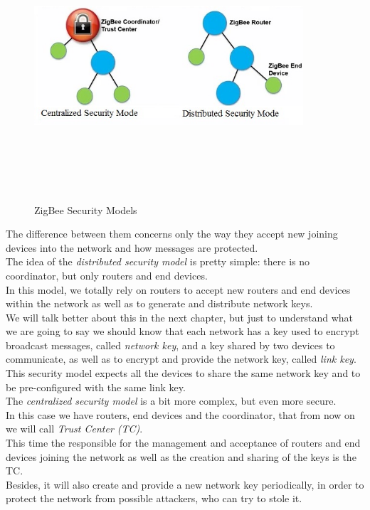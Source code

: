 \documentclass[12pt]{report}
\begin{document}
{{\begin{figure}[H]
\includegraphics[width=10cm,height=10cm,keepaspectratio]{security_models}
\centering
\caption{ZigBee Security Models}
\end{figure}

The difference between them concerns only the way they accept new joining devices into the network and how messages are protected.\\

The idea of the \emph{distributed security model} is pretty simple: there is no coordinator, but only routers and end devices.\\
In this model, we totally rely on routers to accept new routers and end devices within the network as well as to generate and distribute network keys.\\
We will talk better about this in the next chapter, but just to understand what we are going to say we should know that each network has a key used to encrypt broadcast messages, called \emph{network key}, and a key shared by two devices to communicate, as well as to encrypt and provide the network key, called \emph{link key}.\\
This security model expects all the devices to share the same network key and to be pre-configured with the same link key.\\

The \emph{centralized security model} is a bit more complex, but even more secure.\\
In this case we have routers, end devices and the coordinator, that from now on we will call \emph{Trust Center (TC)}.\\
This time the responsible for the management and acceptance of routers and end devices joining the network as well as the creation and sharing of the keys is the TC.\\
Besides, it will also create and provide a new network key periodically, in order to protect the network from possible attackers, who can try to stole it.\\

}}
\end{document}
